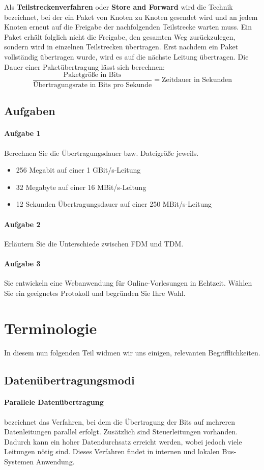 \documentclass[11pt,a4paper]{scrartcl}
\begin{document}
Als \textbf{Teilstreckenverfahren} oder \textbf{Store and Forward} wird die Technik bezeichnet, bei der ein Paket von Knoten zu Knoten gesendet wird und an jedem Knoten erneut auf die Freigabe der nachfolgenden Teilstrecke warten muss. Ein Paket erhält folglich nicht die Freigabe, den gesamten Weg zurückzulegen, sondern wird in einzelnen Teilstrecken übertragen. Erst nachdem ein Paket vollständig übertragen wurde, wird es auf die nächste Leitung übertragen. Die Dauer einer Paketübertragung lässt sich berechnen:
\[\frac{\text{Paketgröße in Bits}}{\text{Übertragungsrate in Bits pro Sekunde}} = \text{Zeitdauer in Sekunden}\]
\subsection{Aufgaben}
\paragraph{Aufgabe 1} Berechnen Sie die Übertragungsdauer bzw. Dateigröße jeweils.
\begin{itemize}
\item 256 Megabit auf einer 1 GBit/s-Leitung
\item 32 Megabyte auf einer 16 MBit/s-Leitung
\item 12 Sekunden Übertragungsdauer auf einer 250 MBit/s-Leitung
\end{itemize}
\paragraph{Aufgabe 2} Erläutern Sie die Unterschiede zwischen FDM und TDM.
\paragraph{Aufgabe 3} Sie entwickeln eine Webanwendung für Online-Vorlesungen in Echtzeit. Wählen Sie ein geeignetes Protokoll und begründen Sie Ihre Wahl.
\section{Terminologie}
In diesem nun folgenden Teil widmen wir uns einigen, relevanten Begrifflichkeiten.
\subsection{Datenübertragungsmodi}
\paragraph{Parallele Datenübertragung} bezeichnet das Verfahren, bei dem die Übertragung der Bits auf mehreren Datenleitungen parallel erfolgt. Zusätzlich sind Steuerleitungen vorhanden. Dadurch kann ein hoher Datendurchsatz erreicht werden, wobei jedoch viele Leitungen nötig sind. Dieses Verfahren findet in internen und lokalen Bus-Systemen Anwendung.
\end{document}
